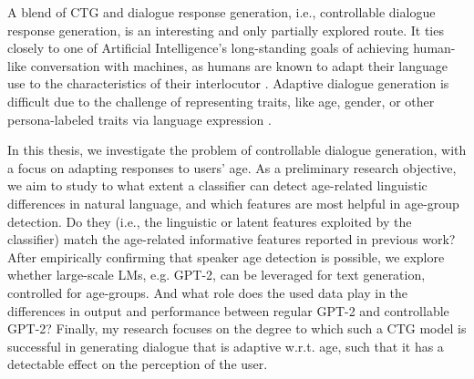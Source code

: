 A blend of CTG and dialogue response generation, i.e., controllable dialogue response generation, is an interesting and only partially explored route. It ties closely to one of Artificial Intelligence's long-standing goals of achieving human-like conversation with machines, as humans are known to adapt their language use to the characteristics of their interlocutor \citep{gallois2015communication}. Adaptive dialogue generation is difficult due to the challenge of representing traits, like age, gender, or other persona-labeled traits via language expression \citep{zheng2019personalized}.

In this thesis, we investigate the problem of controllable dialogue generation, with a focus on adapting responses to users' age. As a preliminary research objective, we aim to study to what extent a classifier can detect age-related linguistic differences in natural language, and which features are most helpful in age-group detection. Do they (i.e., the linguistic or latent features exploited by the classifier) match the age-related informative features reported in previous work? 
After empirically confirming that speaker age detection is possible, we explore whether large-scale LMs, e.g. GPT-2, can be leveraged for text generation, controlled for age-groups. And what role does the used data play in the differences in output and performance between regular GPT-2 and controllable GPT-2?
Finally, my research focuses on the degree to which such a CTG model is successful in generating dialogue that is adaptive w.r.t. age, such that it has a detectable effect on the perception of the user.


